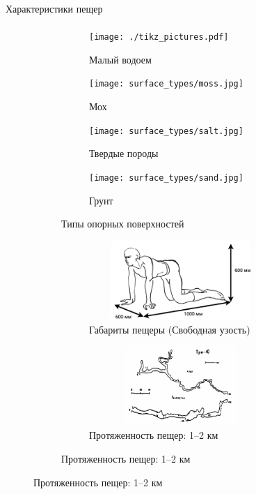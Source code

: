 \begin{frame}[t]{Характеристики пещер}
    \framesubtitle{}
    \vspace{-0.8cm}
    \begin{figure}[H]
        \begin{subfigure}{0.49\textwidth}
            \begin{subfigure}[b]{0.49\textwidth}
                \centering\texttt{[image: ./tikz\_pictures.pdf]}
                \caption{Малый водоем}
            \end{subfigure}
            \hfill
            \begin{subfigure}[b]{0.49\textwidth}
                \centering\texttt{[image: surface\_types/moss.jpg]}\\
                \caption{Мох}
            \end{subfigure}

            \begin{subfigure}[b]{0.49\textwidth}
                \centering\texttt{[image: surface\_types/salt.jpg]}\\
                \caption{Твердые породы}
            \end{subfigure}
            \begin{subfigure}[b]{0.49\textwidth}
                \centering\texttt{[image: surface\_types/sand.jpg]}\\
                \caption{Грунт}
            \end{subfigure}
            \caption*{Типы опорных поверхностей}
        \end{subfigure}
        \begin{subfigure}{0.49\textwidth}
            \begin{subfigure}{0.99\textwidth}
                \centering\includegraphics[height=3cm,width=1\textwidth,keepaspectratio]{../images/human_crawling.png}
                \caption*{Габариты пещеры (Свободная узость)}
            \end{subfigure}

            \begin{subfigure}{0.99\textwidth}
                \centering\includegraphics[height=3cm,width=1\textwidth,keepaspectratio]{../images/cave_maps/map3.png}
                \caption*{Протяженность пещер: 1--2 км}
            \end{subfigure}
        \end{subfigure}
    \end{figure}
\end{frame}

